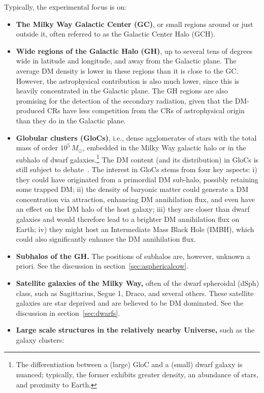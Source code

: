 Typically, the experimental focus is on:
\begin{itemize}
\item[$\circ$] 
{\bf The Milky Way Galactic Center (GC)}, or small regions around or just outside it, often referred to as the Galactic Center Halo (GCH).
\item[$\circ$] 
{\bf Wide regions of the Galactic Halo (GH)},  up to several tens of degrees wide in latitude and longitude, and away from the Galactic plane. The average DM density is lower in these regions than it is close to the GC. However, the astrophysical contribution is also much lower, since this is heavily concentrated in the Galactic plane. The GH regions are also promising for the detection of the secondary radiation, given that the DM-produced CRs have less competition from the  CRs of astrophysical origin than they do in the Galactic plane. 
\item[$\circ$] 
{\bf Globular clusters (GloCs)}, i.e., dense agglomerates of stars with the total mass of order $10^5 \, M_\odot$, 
embedded in the Milky Way galactic halo or in the subhalo of dwarf galaxies.\footnote{The differentiation between a (large) GloC and a (small) dwarf galaxy is nuanced; typically, the former exhibits greater density, an abundance of stars, and proximity to Earth.
} 
The DM content (and its distribution) in GloCs 
is still subject to debate~\cite{DMinGloC}. 
The interest in GloCs stems from four key aspects:
i) they could have originated from a primordial DM sub-halo, possibly retaining some trapped DM;
ii) the density of baryonic matter could generate a DM concentration via attraction, enhancing DM annihilation flux, and even have an effect on the DM halo of the host galaxy;
iii) they are closer than dwarf galaxies and would therefore lead to a brighter DM annihilation flux on Earth; 
iv) they might host an Intermediate Mass Black Hole (IMBH), which could also significantly enhance the DM annihilation flux. 
\item[$\circ$] 
{\bf Subhalos of the GH.} The positions of subhalos are, however, unknown a priori. See the discussion in section~\ref{sec:asphericalcow}.
\item[$\circ$] {\bf Satellite galaxies of the Milky Way,} often of the dwarf spheroidal (dSph) class, such as Sagittarius, Segue 1, Draco, and several others. These satellite galaxies are star deprived and are believed to be DM dominated. See the discussion in section~\ref{sec:dwarfs}.
\item[$\circ$] {\bf Large scale structures in the relatively nearby Universe,} such as the galaxy clusters: 

\end{itemize}
